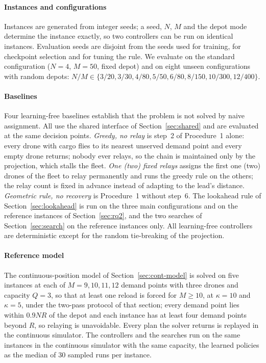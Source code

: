 \documentclass[final,5p,times,twocolumn]{elsarticle}
\begin{document}
\paragraph{Instances and configurations}
Instances are generated from integer seeds; a seed, $N$, $M$ and the depot mode determine the
instance exactly, so two controllers can be run on identical instances. Evaluation seeds are
disjoint from the seeds used for training, for checkpoint selection and for tuning the rule.
We evaluate on the standard configuration ($N=4$, $M=50$, fixed depot) and on eight unseen
configurations with random depots: $N/M \in \{3/20, 3/30, 4/80, 5/50, 6/80, 8/150, 10/300, 12/400\}$.

\paragraph{Baselines}
Four learning-free baselines establish that the problem is not solved by naive assignment. All
use the shared interface of Section~\ref{sec:shared} and are evaluated at the same decision
points. \emph{Greedy, no relay} is step~2 of Procedure~1 alone: every drone with cargo flies to
its nearest unserved demand point and every empty drone returns; nobody ever relays, so the chain
is maintained only by the projection, which stalls the fleet. \emph{One (two) fixed relays}
assigns the first one (two) drones of the fleet to relay permanently and runs the greedy rule on
the others; the relay count is fixed in advance instead of adapting to the lead's distance.
\emph{Geometric rule, no recovery} is Procedure~1 without step~6. The lookahead rule of
Section~\ref{sec:lookahead} is run on the three main configurations and on the reference instances
of Section~\ref{sec:rq2}, and the two searches of Section~\ref{sec:search} on the reference
instances only. All learning-free controllers are deterministic except for the random
tie-breaking of the projection.

\paragraph{Reference model}
The continuous-position model of Section~\ref{sec:cont-model} is solved on five instances at
each of $M = 9, 10, 11, 12$ demand points with three drones and capacity $Q = 3$, so that at least
one reload is forced for $M \ge 10$, at $\kappa = 10$ and $\kappa = 5$, under the two-pass protocol
of that section; every demand point lies within $0.9NR$ of the depot and each instance has at
least four demand points beyond $R$, so relaying is unavoidable. Every plan the solver returns is
replayed in the continuous simulator. The controllers and the searches run on the same instances
in the continuous simulator with the same capacity, the learned policies as the median of 30
sampled runs per instance.
\end{document}
